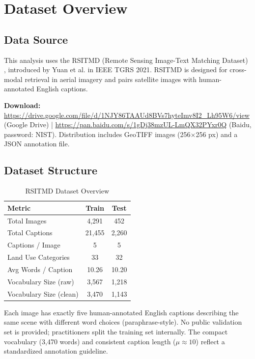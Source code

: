 \section{Dataset Overview}

\subsection{Data Source}

This analysis uses the RSITMD (Remote Sensing Image-Text Matching Dataset) \cite{rsitmd}, introduced by Yuan et al. in IEEE TGRS 2021. RSITMD is designed for cross-modal retrieval in aerial imagery and pairs satellite images with human-annotated English captions.

\textbf{Download:} \url{https://drive.google.com/file/d/1NJY86TAAUd8BVs7hyteImv8I2_Lh95W6/view} (Google Drive) | \url{https://pan.baidu.com/s/1gDj38mzUL-LmQX32PYxr0Q} (Baidu, password: NIST). Distribution includes GeoTIFF images (256$\times$256 px) and a JSON annotation file.

\subsection{Dataset Structure}

\begin{table}[h]
\centering
\caption{RSITMD Dataset Overview}
\label{tab:dataset_overview}
\begin{tabular}{|l|c|c|}
\hline
\textbf{Metric} & \textbf{Train} & \textbf{Test} \\
\hline
Total Images & 4,291 & 452 \\
\hline
Total Captions & 21,455 & 2,260 \\
\hline
Captions / Image & 5 & 5 \\
\hline
Land Use Categories & 33 & 32 \\
\hline
Avg Words / Caption & 10.26 & 10.20 \\
\hline
Vocabulary Size (raw) & 3,567 & 1,218 \\
\hline
Vocabulary Size (clean) & 3,470 & 1,143 \\
\hline
\end{tabular}
\end{table}

Each image has exactly five human-annotated English captions describing the same scene with different word choices (paraphrase-style). No public validation set is provided; practitioners split the training set internally. The compact vocabulary (3,470 words) and consistent caption length ($\mu\approx10$) reflect a standardized annotation guideline.

